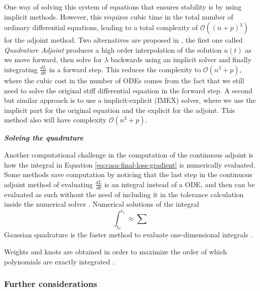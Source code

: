 One way of solving this system of equations that ensures stability is by using implicit methods. 
However, this requires cubic time in the total number of ordinary differential equations, leading to a total complexity of $\mathcal O((n+p)^3)$ for the adjoint method.
Two alternatives are proposed in \cite{kim_stiff_2021}, the first one called \textit{Quadrature Adjoint} produces a high order interpolation of the solution $u(t)$ as we move forward, then solve for $\lambda$ backwards using an implicit solver and finally integrating $\frac{dL}{d\theta}$ in a forward step.
This reduces the complexity to $\mathcal O (n^3 + p)$, where the cubic cost in the number of ODEs comes from the fact that we still need to solve the original stiff differential equation in the forward step. 
A second but similar approach is to use a implicit-explicit (IMEX) solver, where we use the implicit part for the original equation and the explicit for the adjoint. 
This method also will have complexity $\mathcal O (n^3 + p)$.

\vspace*{10px}
\noindent \textbf{\textit{Solving the quadrature}}
\vspace*{5px}

Another computational challenge in the computation of the continuous adjoint is how the integral in Equation \eqref{eq:casa-final-loss-gradient} is numerically evaluated. 
Some methods save computation by noticing that the last step in the continuous adjoint method of evaluating $\frac{dL}{d\theta}$ is an integral instead of a ODE, and then can be evaluated as such without the need of including it in the tolerance calculation inside the numerical solver \cite{that-is-not-an-ode}.
Numerical solutions of the integral 
\begin{equation}
    \int_{t_0}^{t_1} 
    \approx
    \sum 
\end{equation}
Gaussian quadrature is the faster method to evaluate one-dimensional integrals \cite{Norcliffe_gaussquadrature_2023}.

Weights and knots are obtained in order to maximize the order of which polynomials are exactly integrated \cite{stoer2002-numerical}    . 

\subsubsection{Further considerations}


